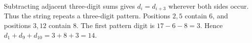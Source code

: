 Subtracting adjacent three-digit sums gives $d_i=d_{i+3}$ wherever both sides occur. Thus the string repeats a three-digit pattern. Positions $2,5$ contain $6$, and positions $3,12$ contain $8$. The first pattern digit is $17-6-8=3$. Hence $d_1+d_9+d_{10}=3+8+3=\boxed{14}$.
